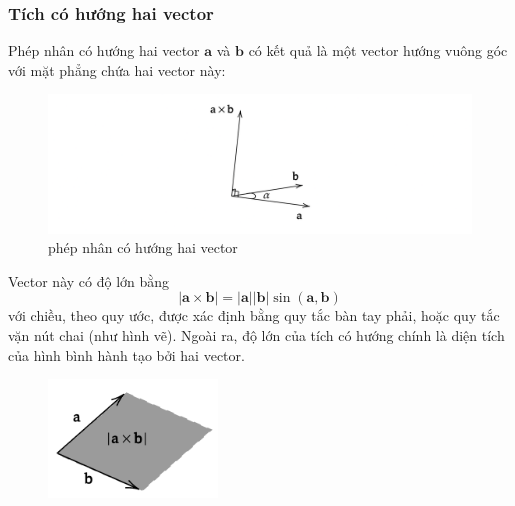 \subsubsection{Tích có hướng hai vector}
Phép nhân có hướng hai vector \(\mathbf{a}\) và \(\mathbf{b}\) có kết quả là một vector hướng vuông góc với mặt phẳng chứa hai vector này:
\begin{figure}[H]
    \centering
    \includegraphics[width=1\textwidth]{Tuan2/Figures/tichcheo.png}
    \caption{phép nhân có hướng hai vector}
\end{figure}
Vector này có độ lớn bằng
\begin{equation}
    |\mathbf{a} \times \mathbf{b}| = |\mathbf{a}| |\mathbf{b}| \sin (\mathbf{a}, \mathbf{b})
\end{equation}
với chiều, theo quy ước,  được xác định bằng quy tắc bàn tay phải, hoặc quy tắc vặn nút chai (như hình vẽ).
Ngoài ra, độ lớn của tích có hướng chính là diện tích của hình bình hành tạo bởi hai vector.
\begin{figure}[H]
    \centering
    \includegraphics[width=0.4\textwidth]{Tuan2/Figures/meaningofcrossproduct.png}
\end{figure} 


